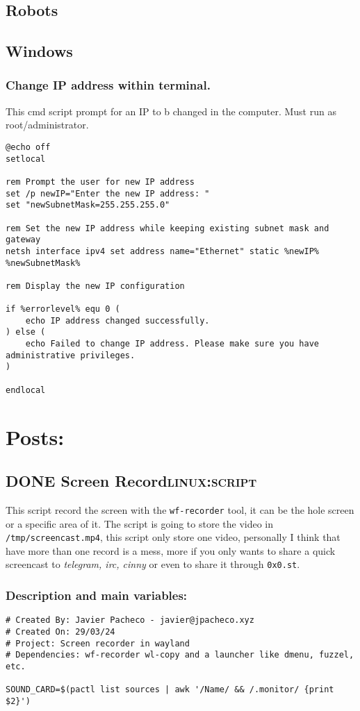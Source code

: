 \documentclass[11pt]{article}
\begin{document}
\subsection{Robots}
\label{sec:org4dc0caa}
\subsection{Windows}
\label{sec:orgc3adde9}
\subsubsection{Change IP address within terminal.}
\label{sec:orgcd758c1}
This cmd script prompt for an IP to b changed in the computer. Must run as root/administrator.
\begin{verbatim}
@echo off
setlocal

rem Prompt the user for new IP address
set /p newIP="Enter the new IP address: "
set "newSubnetMask=255.255.255.0"

rem Set the new IP address while keeping existing subnet mask and gateway
netsh interface ipv4 set address name="Ethernet" static %newIP% %newSubnetMask% 

rem Display the new IP configuration

if %errorlevel% equ 0 (
    echo IP address changed successfully.
) else (
    echo Failed to change IP address. Please make sure you have administrative privileges.
)

endlocal
\end{verbatim}
\section{Posts:}
\label{sec:org4d788ad}
\subsection{{\bfseries\sffamily DONE} Screen Record\hfill{}\textsc{linux:script}}
\label{sec:orgaa27a08}
This script record the screen with the \texttt{wf-recorder} tool, it can be the hole screen or a specific area of it.
The script is going to store the video in \texttt{/tmp/screencast.mp4}, this script only store one video, personally I think that have more than one record is a mess, more if you only wants to share a quick screencast to \emph{telegram, irc, cinny} or even to share it through \texttt{0x0.st}.
\subsubsection{Description and main variables:}
\label{sec:orgdd3ae36}
\begin{verbatim}
# Created By: Javier Pacheco - javier@jpacheco.xyz
# Created On: 29/03/24
# Project: Screen recorder in wayland
# Dependencies: wf-recorder wl-copy and a launcher like dmenu, fuzzel, etc.

SOUND_CARD=$(pactl list sources | awk '/Name/ && /.monitor/ {print $2}')
\end{verbatim}
\end{document}
